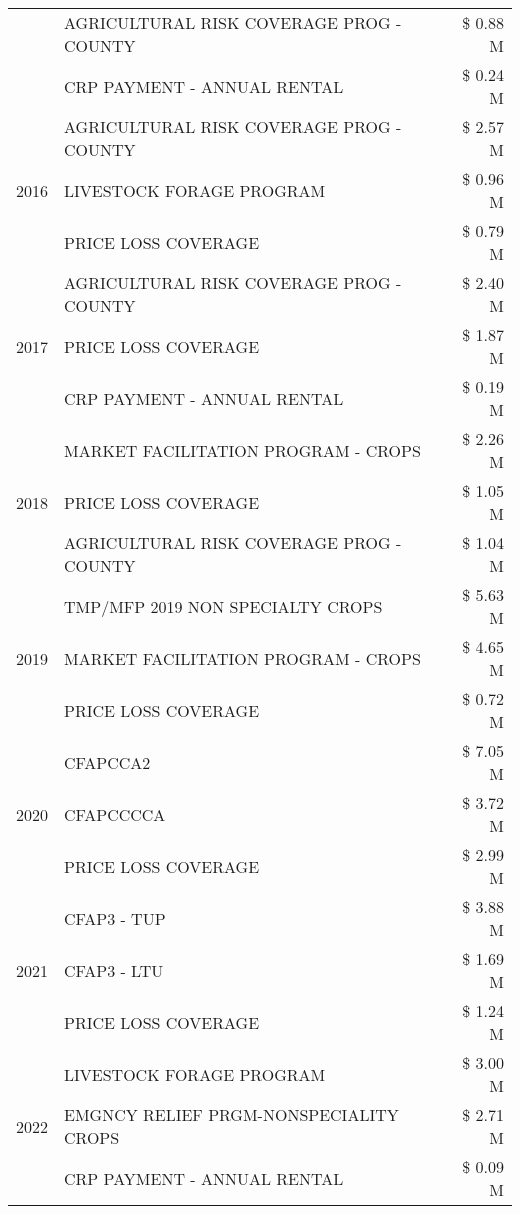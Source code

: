 \begin{tabular}{llr}
 & AGRICULTURAL RISK COVERAGE PROG - COUNTY & \$ 0.88 M \\
 & CRP PAYMENT - ANNUAL RENTAL & \$ 0.24 M \\
\cline{1-3}
\multirow[t]{3}{*}{2016} & AGRICULTURAL RISK COVERAGE PROG - COUNTY & \$ 2.57 M \\
 & LIVESTOCK FORAGE PROGRAM & \$ 0.96 M \\
 & PRICE LOSS COVERAGE & \$ 0.79 M \\
\cline{1-3}
\multirow[t]{3}{*}{2017} & AGRICULTURAL RISK COVERAGE PROG - COUNTY & \$ 2.40 M \\
 & PRICE LOSS COVERAGE & \$ 1.87 M \\
 & CRP PAYMENT - ANNUAL RENTAL & \$ 0.19 M \\
\cline{1-3}
\multirow[t]{3}{*}{2018} & MARKET FACILITATION PROGRAM - CROPS & \$ 2.26 M \\
 & PRICE LOSS COVERAGE & \$ 1.05 M \\
 & AGRICULTURAL RISK COVERAGE PROG - COUNTY & \$ 1.04 M \\
\cline{1-3}
\multirow[t]{3}{*}{2019} & TMP/MFP 2019 NON SPECIALTY CROPS & \$ 5.63 M \\
 & MARKET FACILITATION PROGRAM - CROPS & \$ 4.65 M \\
 & PRICE LOSS COVERAGE & \$ 0.72 M \\
\cline{1-3}
\multirow[t]{3}{*}{2020} & CFAPCCA2 & \$ 7.05 M \\
 & CFAPCCCCA & \$ 3.72 M \\
 & PRICE LOSS COVERAGE & \$ 2.99 M \\
\cline{1-3}
\multirow[t]{3}{*}{2021} & CFAP3 - TUP & \$ 3.88 M \\
 & CFAP3 - LTU & \$ 1.69 M \\
 & PRICE LOSS COVERAGE & \$ 1.24 M \\
\cline{1-3}
\multirow[t]{3}{*}{2022} & LIVESTOCK FORAGE PROGRAM & \$ 3.00 M \\
 & EMGNCY RELIEF PRGM-NONSPECIALITY CROPS & \$ 2.71 M \\
 & CRP PAYMENT - ANNUAL RENTAL & \$ 0.09 M \\
\cline{1-3}
\bottomrule
\end{tabular}
